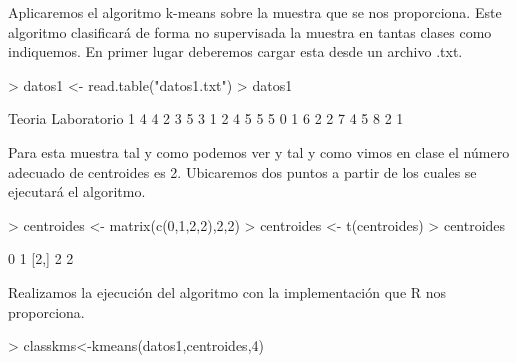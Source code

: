 \documentclass [a4paper] {article}
\begin{document}
Aplicaremos el algoritmo k-means sobre la muestra que se nos proporciona.
Este algoritmo clasificará de forma no supervisada la muestra en tantas clases como indiquemos.
En primer lugar deberemos cargar esta desde un archivo .txt.
\begin{Schunk}
\begin{Sinput}
> datos1 <- read.table("datos1.txt")
> datos1
\end{Sinput}
\begin{Soutput}
  Teoria Laboratorio
1      4           4
2      3           5
3      1           2
4      5           5
5      0           1
6      2           2
7      4           5
8      2           1
\end{Soutput}
\end{Schunk}

Para esta muestra tal y como podemos ver y tal y como vimos en clase el número adecuado de centroides es 2.
Ubicaremos dos puntos a partir de los cuales se ejecutará el algoritmo.
\begin{Schunk}
\begin{Sinput}
> centroides <- matrix(c(0,1,2,2),2,2)
> centroides <- t(centroides)
> centroides
\end{Sinput}
\begin{Soutput}
     [,1] [,2]
[1,]    0    1
[2,]    2    2
\end{Soutput}
\end{Schunk}

Realizamos la ejecución del algoritmo con la implementación que R nos proporciona.
\begin{Schunk}
\begin{Sinput}
> classkms<-kmeans(datos1,centroides,4)
\end{Sinput}
\end{Schunk}
\end{document}
